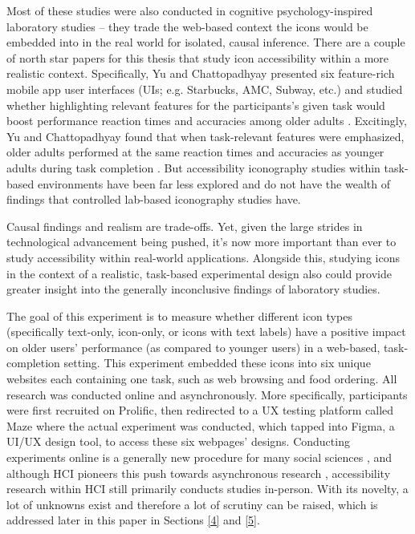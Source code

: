 \documentclass[12pt,twoside]{reedthesis}
\begin{document}
    Most of these studies were also conducted in cognitive psychology-inspired laboratory studies \cite{stephanidis_seven_2019}– they trade the web-based context the icons would be embedded into in the real world for isolated, causal inference. There are a couple of north star papers for this thesis that study icon accessibility within a more realistic context. Specifically, Yu and Chattopadhyay presented six feature-rich mobile app user interfaces (UIs; e.g. Starbucks, AMC, Subway, etc.) and studied whether highlighting relevant features for the participants’s given task would boost performance reaction times and accuracies among older adults \cite{yu_reducing_2024}. Excitingly, Yu and Chattopadhyay found that when task-relevant features were emphasized, older adults performed at the same reaction times and accuracies as younger adults during task completion \cite{yu_reducing_2024}. But accessibility iconography studies within task-based environments have been far less explored and do not have the wealth of findings that controlled lab-based iconography studies have.
    
    Causal findings and realism are trade-offs. Yet, given the large strides in technological advancement being pushed, it’s now more important than ever to study accessibility within real-world applications. Alongside this, studying icons in the context of a realistic, task-based experimental design also could provide greater insight into the generally inconclusive findings of laboratory studies. 
    
 	The goal of this experiment is to measure whether different icon types (specifically text-only, icon-only, or icons with text labels) have a positive impact on older users' performance (as compared to younger users) in a web-based, task-completion setting. This experiment embedded these icons into six unique websites each containing one task, such as web browsing and food ordering. All research was conducted online and asynchronously. More specifically, participants were first recruited on Prolific, then redirected to a UX testing platform called Maze where the actual experiment was conducted, which tapped into Figma, a UI/UX design tool, to access these six webpages’ designs. Conducting experiments online is a generally new procedure for many social sciences \cite{jensen_does_2022}, and although HCI pioneers this push towards asynchronous research \cite{lu_understanding_2025}, accessibility research within HCI still primarily conducts studies in-person. With its novelty, a lot of unknowns exist and therefore a lot of scrutiny can be raised, which is addressed later in this paper in Sections \ref{4} and \ref{5}.
    
\end{document}
